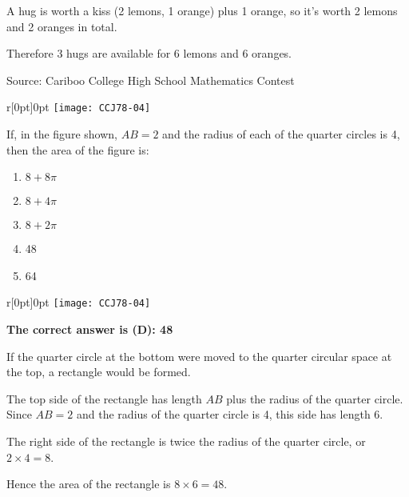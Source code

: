 \documentclass{article}
\begin{document}
A hug is worth a kiss (2 lemons, 1 orange) plus 1 orange, so it's worth 2 lemons and 2 oranges in total.

Therefore 3 hugs are available for 6 lemons and 6 oranges.

\vskip 1.5cm


\scriptsize
Source: Cariboo College High School Mathematics Contest

\normalsize
\begin{wrapfigure}[2]{r}[0pt]{0pt}
	\texttt{[image: CCJ78-04]}
\end{wrapfigure}
If, in the figure shown, $AB=2$ and the radius of each of the quarter circles is 4, then the area of the figure is:

\begin{enumerate}[noitemsep,topsep=0mm,leftmargin=*,widest=D,label=\Alph*)]
	\item $8+8\pi$
	\item $8+4\pi$
	\item $8+2\pi$
	\item 48
	\item 64
\end{enumerate}

\begin{wrapfigure}{r}[0pt]{0pt}
	\texttt{[image: CCJ78-04]}
\end{wrapfigure}
\textbf{The correct answer is (D): 48}

If the quarter circle at the bottom were moved to the quarter circular space at the top, a rectangle would be formed.

The top side of the rectangle has length $AB$ plus the radius of the quarter circle. Since $AB=2$ and the radius of the quarter circle is 4, this side has length 6.

The right side of the rectangle is twice the radius of the quarter circle, or $2 \times 4 = 8$.

Hence the area of the rectangle is $8 \times 6 =48$.

\vskip 1.5cm

\end{document}
